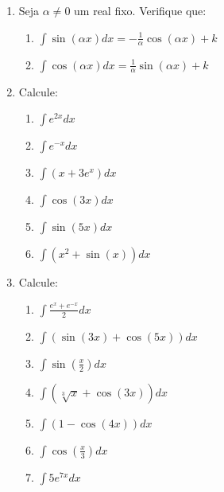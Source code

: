 \documentclass[oneside,a4paper,12pt]{article}
\begin{document}
\begin{enumerate}
	\item Seja $\alpha \neq 0$ um real fixo. Verifique que:
	\begin{enumerate}
		\item $\displaystyle \int \sin(\alpha x)dx = - \frac{1}{\alpha}\cos(\alpha x) + k$
		\item $\displaystyle \int \cos(\alpha x)dx = \frac{1}{\alpha} \sin (\alpha x) + k$ 
	\end{enumerate}
	
	\item Calcule:
	\begin{multicols}{2}
		\begin{enumerate}
			\item $\displaystyle \int e^{2x}dx$\\
			\item $\displaystyle \int e^{-x}dx$
			\item $\displaystyle \int (x + 3e^{x})dx$
			\item $\displaystyle \int \cos(3x)dx$
			\item $\displaystyle \int \sin(5x)dx$
			\item $\displaystyle \int (x^2 + \sin(x))dx$
		\end{enumerate}
	\end{multicols}
	
	\item Calcule:
	\begin{multicols}{2}
		\begin{enumerate}
			\item $\displaystyle \int \frac{e^x + e^{-x}}{2}dx$
			\item $\displaystyle \int (\sin(3x) + \cos(5x))dx$
			\item $\displaystyle \int \sin(\frac{x}{2})dx$
			\item $\displaystyle \int (\sqrt[3]{x} + \cos(3x))dx$
			\item $\displaystyle \int (1 - \cos(4x))dx$
			\item $\displaystyle \int \cos (\frac{x}{3})dx$
			\item $\displaystyle \int 5e^{7x}dx$
		\end{enumerate}
	\end{multicols}
	

\end{enumerate}
\end{document}
